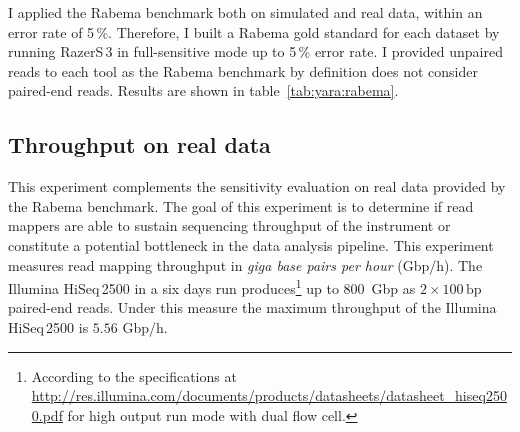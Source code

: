I applied the Rabema benchmark both on simulated and real data, within an error rate of 5\,\%.
Therefore, I built a Rabema gold standard for each dataset by running RazerS\,3 in full-sensitive mode up to 5\,\% error rate.
I provided unpaired reads to each tool as the Rabema benchmark by definition does not consider paired-end reads.
Results are shown in table~\ref{tab:yara:rabema}.



\begin{table*}[t]
  \caption[Yara results in the Rabema benchmark]
  {
  \label{tab:yara:rabema}
    Rabema benchmark results on the human whole genome.
    The left panel shows the results of mapping $1\,\text{M}$ Illumina-like $2 \times 100\,\text{bp}$ simulated reads; the right panel shows the results of mapping $1\,\text{M}$ Illumina $2 \times 100\,\text{bp}$ real reads.
    Big numbers show total Rabema scores, while small numbers show marginal scores for the mapping locations at
    $\bigl(\begin{smallmatrix}\mbox{\tiny 0}&\mbox{\tiny 1}&\mbox{\tiny 2}\\\mbox{\tiny 3}&\mbox{\tiny 4}&\mbox{\tiny 5}\end{smallmatrix}\bigr)$ \% error rate.
    }
  \vspace{-3mm}
  \center
  \sffamily
  \resizebox{0.95\textwidth}{!}
  {
	\renewcommand{\tabcolsep}{0.8ex}
	
  }
\end{table*}


\subsection{Throughput on real data}

This experiment complements the sensitivity evaluation on real data provided by the Rabema benchmark.
The goal of this experiment is to determine if read mappers are able to sustain sequencing throughput of the instrument or constitute a potential bottleneck in the data analysis pipeline.
This experiment measures read mapping throughput in \emph{giga base pairs per hour} (Gbp/h).
The Illumina HiSeq\,2500 in a six days run produces\footnote{According to the specifications at \url{http://res.illumina.com/documents/products/datasheets/datasheet_hiseq2500.pdf} for high output run mode with dual flow cell.} up to 800~Gbp as $2 \times 100\,\text{bp}$ paired-end reads.
Under this measure the maximum throughput of the Illumina HiSeq\,2500 is $5.56$ Gbp/h.

